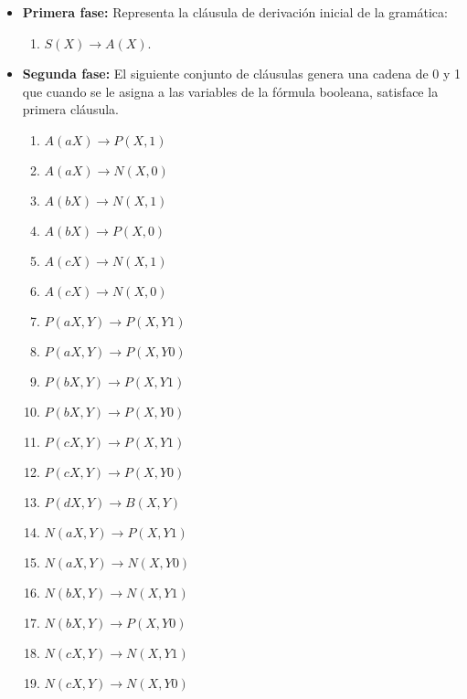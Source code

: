 \documentclass{article}
\begin{document}
\begin{itemize}
    \item \textbf{Primera fase:} Representa la cláusula de derivación inicial de la gramática:
          \begin{enumerate}
              \item $S(X)\to A(X)$.
          \end{enumerate}

    \item \textbf{Segunda fase:} El siguiente conjunto de cláusulas genera una cadena de 0 y 1 que cuando se le asigna a las variables de la fórmula booleana, satisface la primera cláusula.
          \begin{multicols}{2}
              \begin{enumerate}[start=2]
                  \item $A(aX)\to P(X,1)$
                  \item $A(aX)\to N(X,0)$
                  \item $A(bX)\to N(X,1)$
                  \item $A(bX)\to P(X,0)$
                  \item $A(cX)\to N(X,1)$
                  \item $A(cX)\to N(X,0)$

                  \item $P(aX,Y)\to P(X,Y1)$
                  \item $P(aX,Y)\to P(X,Y0)$
                  \item $P(bX,Y)\to P(X,Y1)$
                  \item $P(bX,Y)\to P(X,Y0)$
                  \item $P(cX,Y)\to P(X,Y1)$
                  \item $P(cX,Y)\to P(X,Y0)$
                  \item $P(dX,Y)\to B(X,Y)$

                  \item $N(aX,Y)\to P(X,Y1)$
                  \item $N(aX,Y)\to N(X,Y0)$
                  \item $N(bX,Y)\to N(X,Y1)$
                  \item $N(bX,Y)\to P(X,Y0)$
                  \item $N(cX,Y)\to N(X,Y1)$
                  \item $N(cX,Y)\to N(X,Y0)$
              \end{enumerate}
          \end{multicols}


\end{itemize}
\end{document}
